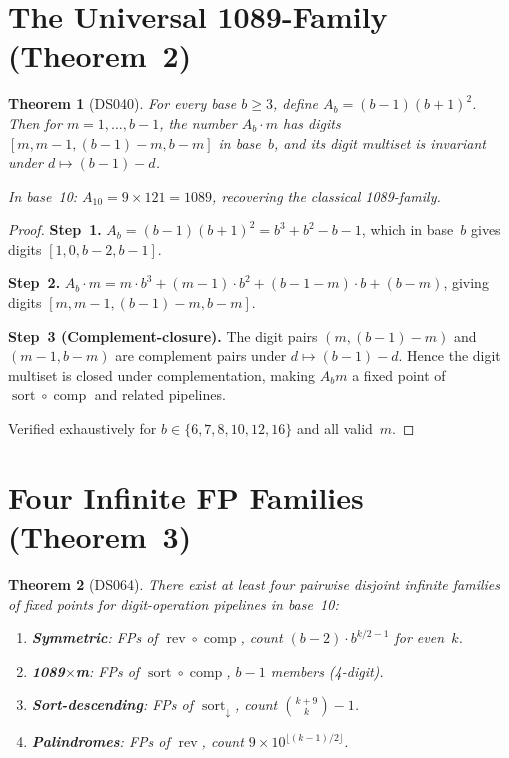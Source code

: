 \documentclass[11pt,a4paper]{amsart}
\theoremstyle{plain}
\newtheorem{theorem}{Theorem}
\theoremstyle{definition}
\theoremstyle{remark}
\DeclareMathOperator{\rev}{rev}
\DeclareMathOperator{\comp}{comp}
\DeclareMathOperator{\sort}{sort}
\begin{document}
\section{The Universal 1089-Family (Theorem~2)}\label{sec:1089}

\begin{theorem}[DS040]\label{thm:1089}
For every base $b \geq 3$, define $A_b = (b{-}1)(b{+}1)^2$. Then for
$m = 1, \ldots, b{-}1$, the number $A_b \cdot m$ has digits
$[m, m{-}1, (b{-}1){-}m, b{-}m]$ in base~$b$, and its digit multiset is
invariant under $d \mapsto (b{-}1){-}d$.

In base~10: $A_{10} = 9 \times 121 = 1089$, recovering the classical
1089-family.
\end{theorem}

\begin{proof}
\textbf{Step~1.}
$A_b = (b{-}1)(b{+}1)^2 = b^3 + b^2 - b - 1$, which in base~$b$ gives
digits $[1, 0, b{-}2, b{-}1]$.

\textbf{Step~2.}
$A_b \cdot m = m \cdot b^3 + (m{-}1) \cdot b^2 + (b{-}1{-}m) \cdot b + (b{-}m)$,
giving digits $[m, m{-}1, (b{-}1){-}m, b{-}m]$.

\textbf{Step~3 (Complement-closure).}
The digit pairs $(m, (b{-}1){-}m)$ and $(m{-}1, b{-}m)$ are complement pairs
under $d \mapsto (b{-}1){-}d$. Hence the digit multiset is closed under
complementation, making $A_b m$ a fixed point of $\sort \circ \comp$ and
related pipelines.

Verified exhaustively for $b \in \{6, 7, 8, 10, 12, 16\}$ and all valid~$m$.
\end{proof}

\section{Four Infinite FP Families (Theorem~3)}\label{sec:four-families}

\begin{theorem}[DS064]\label{thm:four-families}
There exist at least four pairwise disjoint infinite families of fixed points
for digit-operation pipelines in base~10:
\begin{enumerate}
\item[\textup{(i)}] \textbf{Symmetric}: FPs of $\rev \circ \comp$, count
  $(b{-}2) \cdot b^{k/2-1}$ for even~$k$.
\item[\textup{(ii)}] \textbf{1089$\times$m}: FPs of $\sort \circ \comp$,
  $b{-}1$ members (4-digit).
\item[\textup{(iii)}] \textbf{Sort-descending}: FPs of $\sort_\downarrow$,
  count $\binom{k+9}{k} - 1$.
\item[\textup{(iv)}] \textbf{Palindromes}: FPs of $\rev$, count
  $9 \times 10^{\lfloor(k-1)/2\rfloor}$.
\end{enumerate}
\end{theorem}
\end{document}
